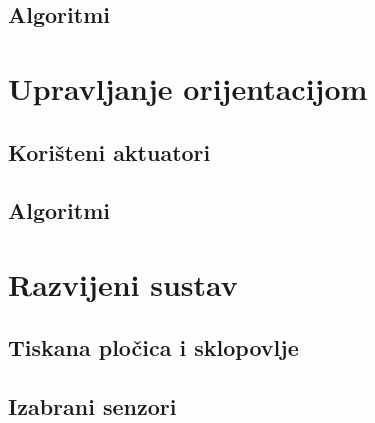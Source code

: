 \documentclass[times, utf8, diplomski, numeric]{templates/template}
\begin{document}
{{        \subsection{Algoritmi}{
        }
    }

    \section{Upravljanje orijentacijom}{
        \subsection{Korišteni aktuatori}{
        }

        \subsection{Algoritmi}{
        }
    }

    \section{Razvijeni sustav}{
        \subsection{Tiskana pločica i sklopovlje}{
        }

        \subsection{Izabrani senzori}{
        }

}}
\end{document}

